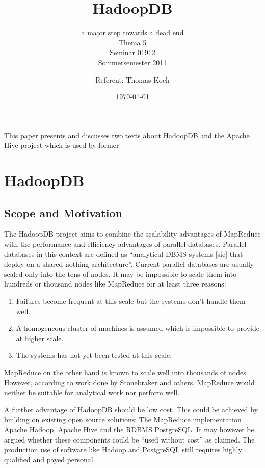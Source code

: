 \documentclass[12pt,a4paper]{scrartcl}		%
\begin{document}
\title{HadoopDB}
\subtitle{a major step towards a dead end\\
Thema 5\\Seminar 01912\\ Sommersemester 2011}
\author{Referent: Thomas Koch}
\date{\today}
\maketitle{}

\newpage{}
\tableofcontents{}
\newpage{}

This paper presents and discusses two texts about HadoopDB\cite{journals/pvldb/AbouzeidBARS09} and the Apache Hive\cite{Thusoo_hive-a} project which is used by former.

\section{HadoopDB}

\subsection{Scope and Motivation}

The HadoopDB project aims to combine the scalability advantages of MapReduce with the performance and efficiency advantages of parallel databases. Parallel databases in this context are defined as ``analytical DBMS systems [sic] that deploy on a shared-nothing architecture''. 
Current parallel databases are usually scaled only into the tens of nodes. It may be impossible to scale them into hundreds or thousand nodes like MapReduce for at least three reasons:

\begin{enumerate}
\item Failures become frequent at this scale but the systems don't handle them well.
\item A homogeneous cluster of machines is assumed which is impossible to provide at higher scale.
\item The systems has not yet been tested at this scale.
\end{enumerate}

MapReduce on the other hand is known to scale well into thousands of nodes. However, according to work done by Stonebraker and others, MapReduce would neither be suitable for analytical work\cite{sto08stepback} nor perform well\cite{Pavlo09}.

A further advantage of HadoopDB should be low cost. This could be achieved by building on existing open source solutions: The MapReduce implementation Apache Hadoop, Apache Hive and the RDBMS PostgreSQL. It may however be argued whether these components could be ``used without cost'' as claimed. The production use of software like Hadoop and PostgreSQL still requires highly qualified and payed personal.
\end{document}
